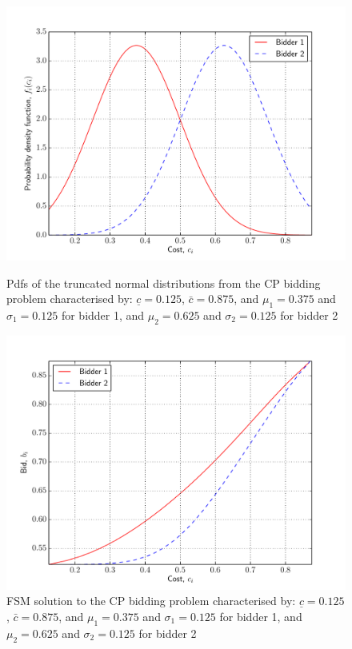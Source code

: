 \begin{figure}[p!]
  \includegraphics[width=\figsize]{Approximation/Figures/test_truncated_normal_pdfs}
  \caption{Pdfs of the truncated normal distributions from the CP bidding problem characterised by: $\underline{c}=0.125$, $\bar{c}=0.875$, and $\mu_1=0.375$ and $\sigma_1=0.125$ for bidder 1, and $\mu_2=0.625$ and $\sigma_2=0.125$ for bidder 2}
  \label{fig:test_truncated_normal_pdfs_approximation}
  \vspace{10mm}
  \includegraphics[width=\figsize]{Approximation/Figures/test_truncated_normal_bids}
  \caption{FSM solution to the CP bidding problem characterised by: $\underline{c}=0.125$, $\bar{c}=0.875$, and $\mu_1=0.375$ and $\sigma_1=0.125$ for bidder 1, and $\mu_2=0.625$ and $\sigma_2=0.125$ for bidder 2}
  \label{fig:test_truncated_normal_bids_approximation}
\end{figure}

